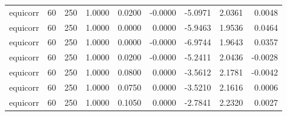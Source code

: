 \begin{tabular}{lrrrrrrrr}
equicorr & 60 & 250 & 1.0000 & 0.0200 & -0.0000 & -5.0971 & 2.0361 & 0.0048 \\
equicorr & 60 & 250 & 1.0000 & 0.0000 & 0.0000 & -5.9463 & 1.9536 & 0.0464 \\
equicorr & 60 & 250 & 1.0000 & 0.0000 & -0.0000 & -6.9744 & 1.9643 & 0.0357 \\
equicorr & 60 & 250 & 1.0000 & 0.0200 & -0.0000 & -5.2411 & 2.0436 & -0.0028 \\
equicorr & 60 & 250 & 1.0000 & 0.0800 & 0.0000 & -3.5612 & 2.1781 & -0.0042 \\
equicorr & 60 & 250 & 1.0000 & 0.0750 & 0.0000 & -3.5210 & 2.1616 & 0.0006 \\
equicorr & 60 & 250 & 1.0000 & 0.1050 & 0.0000 & -2.7841 & 2.2320 & 0.0027 \\
\bottomrule
\end{tabular}
